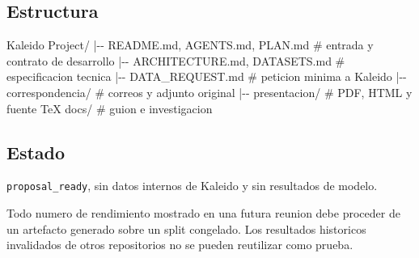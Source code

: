 \documentclass[
  spanish,
  10pt,
  a4paper,
]{article}
\newenvironment{Shaded}{}{}
\newcommand{\NormalTok}[1]{#1}
\begin{document}
\subsection{Estructura}\label{estructura}

\begin{Shaded}
\begin{Highlighting}[]
\NormalTok{Kaleido Project/}
\NormalTok{|{-}{-} README.md, AGENTS.md, PLAN.md        \# entrada y contrato de desarrollo}
\NormalTok{|{-}{-} ARCHITECTURE.md, DATASETS.md         \# especificacion tecnica}
\NormalTok{|{-}{-} DATA\_REQUEST.md                      \# peticion minima a Kaleido}
\NormalTok{|{-}{-} correspondencia/                     \# correos y adjunto original}
\NormalTok{|{-}{-} presentacion/                        \# PDF, HTML y fuente TeX}
\NormalTok{\textasciigrave{}{-}{-} docs/                                \# guion e investigacion}
\end{Highlighting}
\end{Shaded}

\subsection{Estado}\label{estado}

\texttt{proposal\_ready}, sin datos internos de Kaleido y sin resultados
de modelo.

Todo numero de rendimiento mostrado en una futura reunion debe proceder
de un artefacto generado sobre un split congelado. Los resultados
historicos invalidados de otros repositorios no se pueden reutilizar
como prueba.
\end{document}

